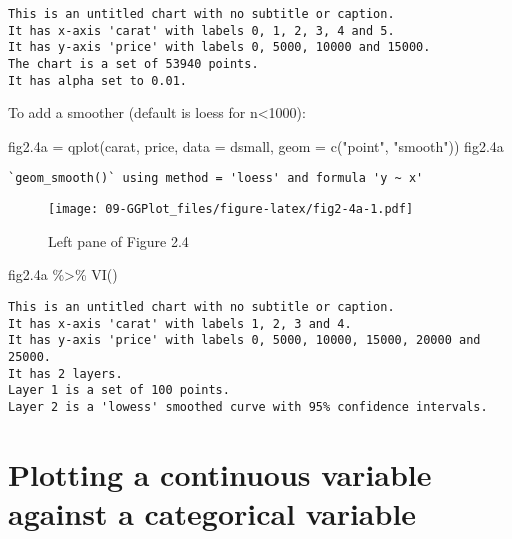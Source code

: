 \documentclass[
]{book}
\newenvironment{Shaded}{\begin{snugshade}}{\end{snugshade}}
\newcommand{\AttributeTok}[1]{\textcolor[rgb]{0.77,0.63,0.00}{#1}}
\newcommand{\FloatTok}[1]{\textcolor[rgb]{0.00,0.00,0.81}{#1}}
\newcommand{\FunctionTok}[1]{\textcolor[rgb]{0.00,0.00,0.00}{#1}}
\newcommand{\NormalTok}[1]{#1}
\newcommand{\OtherTok}[1]{\textcolor[rgb]{0.56,0.35,0.01}{#1}}
\newcommand{\SpecialCharTok}[1]{\textcolor[rgb]{0.00,0.00,0.00}{#1}}
\newcommand{\StringTok}[1]{\textcolor[rgb]{0.31,0.60,0.02}{#1}}
\begin{document}
\begin{verbatim}
This is an untitled chart with no subtitle or caption.
It has x-axis 'carat' with labels 0, 1, 2, 3, 4 and 5.
It has y-axis 'price' with labels 0, 5000, 10000 and 15000.
The chart is a set of 53940 points.
It has alpha set to 0.01.
\end{verbatim}

To add a smoother (default is loess for n\textless1000):

\begin{Shaded}
\begin{Highlighting}[]
\NormalTok{fig2}\FloatTok{.4}\NormalTok{a }\OtherTok{=} \FunctionTok{qplot}\NormalTok{(carat, price, }\AttributeTok{data =}\NormalTok{ dsmall, }\AttributeTok{geom =} \FunctionTok{c}\NormalTok{(}\StringTok{"point"}\NormalTok{, }\StringTok{"smooth"}\NormalTok{))    }
\NormalTok{fig2}\FloatTok{.4}\NormalTok{a}
\end{Highlighting}
\end{Shaded}

\begin{verbatim}
`geom_smooth()` using method = 'loess' and formula 'y ~ x'
\end{verbatim}

\begin{figure}
\centering
\texttt{[image: 09-GGPlot\_files/figure-latex/fig2-4a-1.pdf]}
\caption{\label{fig:fig2-4a}Left pane of Figure 2.4}
\end{figure}

\begin{Shaded}
\begin{Highlighting}[]
\NormalTok{fig2}\FloatTok{.4}\NormalTok{a }\SpecialCharTok{\%\textgreater{}\%} \FunctionTok{VI}\NormalTok{()   }
\end{Highlighting}
\end{Shaded}

\begin{verbatim}
This is an untitled chart with no subtitle or caption.
It has x-axis 'carat' with labels 1, 2, 3 and 4.
It has y-axis 'price' with labels 0, 5000, 10000, 15000, 20000 and 25000.
It has 2 layers.
Layer 1 is a set of 100 points.
Layer 2 is a 'lowess' smoothed curve with 95% confidence intervals.
\end{verbatim}

\hypertarget{plotting-a-continuous-variable-against-a-categorical-variable}{%
\section{Plotting a continuous variable against a categorical variable}\label{plotting-a-continuous-variable-against-a-categorical-variable}}
\end{document}
